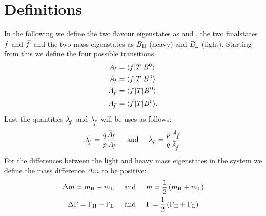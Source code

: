 \section{Definitions}

In the following we define the two flavour eigenstates as \Bz and \Bzb, the two finalstates $\mbox{\ensuremath{f}}$ and $\mbox{\ensuremath{\kern 2.5pt\overline{\kern -2.5pt f\kern 1pt}}}$ and the two mass eigenstates as
$B_{\text{H}}$ (heavy) and $B_{\text{L}}$ (light). Starting from this we define the four possible transitions
\begin{align}
   \Af &= \bra{\f}T\ket{\Bz}\\
   \Abarf &= \bra{\f}T\ket{\Bzb} \\
   \Abarfbar &= \bra{\fbar}T\ket{\Bzb}\\
   \Afbar &= \bra{\fbar}T\ket{\Bz}.
\end{align}
Last the quantities $\Lf$ and $\Lfbar$ will be uses as follows:
\begin{equation}
    \Lf = \frac{q}{p}\frac{\Abarf}{\Af} \hspace{0.5cm} \text{and} \hspace{0.5cm} \Lfbar
    = \frac{p}{q}\frac{\Afbar}{\Abarfbar}
\end{equation}
For the differences between the light and heavy mass eigenstates in the \B system we define the mass difference $\Delta m$ to be positive:
\begin{align}
    \Delta m = m_{\text{H}} - m_{\text{L}} \hspace{0.5cm} &\text{and} \hspace{0.5cm} m = \frac{1}{2}\left(m_{\text{H}}+ m_{\text{L}}\right)\label{eq:defmassdiff}\\
    \Delta \Gamma = \Gamma_{\text{H}} - \Gamma_{\text{L}} \hspace{0.5cm} &\text{and} \hspace{0.5cm} \Gamma = \frac{1}{2}\left(\Gamma_{\text{H}} + \Gamma_{\text{L}}\right)\label{eq:defdecratewidth}
\end{align}
